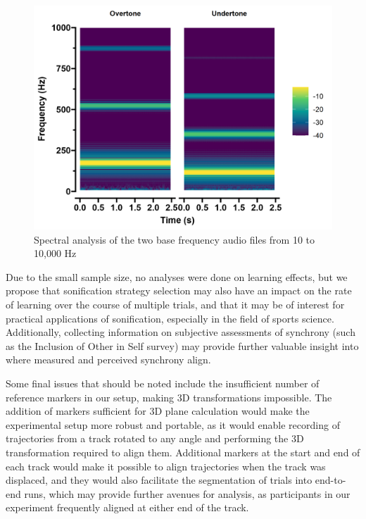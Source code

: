 \documentclass[10pt,a4paper,onecolumn]{article}
\begin{document}
\begin{figure}[h]

{\centering \includegraphics[width=1\linewidth]{figures/spec_tones} 

}

\caption{Spectral analysis of the two base frequency audio files from 10 to 10,000 Hz}\label{fig:stimuli-spectra}
\end{figure}

Due to the small sample size, no analyses were done on learning effects, but we propose that sonification strategy selection may also have an impact on the rate of learning over the course of multiple trials, and that it may be of interest for practical applications of sonification, especially in the field of sports science. Additionally, collecting information on subjective assessments of synchrony (such as the Inclusion of Other in Self survey) may provide further valuable insight into where measured and perceived synchrony align.

Some final issues that should be noted include the insufficient number of reference markers in our setup, making 3D transformations impossible. The addition of markers sufficient for 3D plane calculation would make the experimental setup more robust and portable, as it would enable recording of trajectories from a track rotated to any angle and performing the 3D transformation required to align them. Additional markers at the start and end of each track would make it possible to align trajectories when the track was displaced, and they would also facilitate the segmentation of trials into end-to-end runs, which may provide further avenues for analysis, as participants in our experiment frequently aligned at either end of the track.
\end{document}

